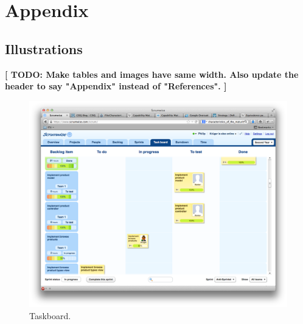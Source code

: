 \section*{Appendix}
\renewcommand*\thesubsection{\Roman{subsection}} %
\subsection{Illustrations} \label{illustrations}

\textbf{[ TODO: Make tables and images have same width. Also update the header to say "Appendix" instead of "References". ]}

\begin{figure}[H]
  \centering
  \includegraphics[width=\textwidth]{illustrations/taskboard}
  \caption{Taskboard.}
  \label{taskboard}
\end{figure}

